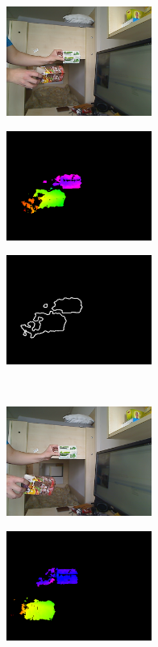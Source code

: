 \begin{figure}[b!]
\begin{subfigure}[b]{.32\linewidth}
	\centering
	\includegraphics[width=135pt]{figures/scene2/left_130.png}
  \end{subfigure}
\begin{subfigure}[b]{.32\linewidth}
	\centering
	\includegraphics[width=135pt]{figures/scene2/vis_130.png}
  \end{subfigure}
\begin{subfigure}[b]{.32\linewidth}
	\centering
	\includegraphics[width=135pt]{figures/scene2/ctr_130.png}
  \end{subfigure}\\\vspace{5pt}
  \begin{subfigure}[b]{.32\linewidth}
	\centering
	\includegraphics[width=135pt]{figures/scene2/left_215.png}
  \end{subfigure}
\begin{subfigure}[b]{.32\linewidth}
	\centering
	\includegraphics[width=135pt]{figures/scene2/vis_215.png}

\end{subfigure}
\end{figure}
